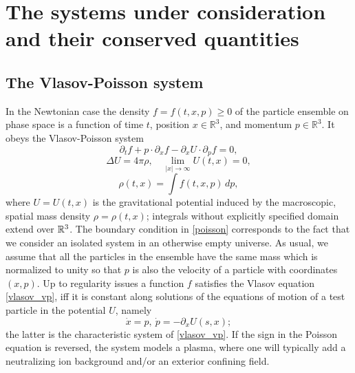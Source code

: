 \documentclass[11pt]{article}
\begin{document}
\section{The systems under consideration and their conserved quantities}
\setcounter{equation}{0}
%
%
\subsection{The Vlasov-Poisson system}\label{ss_vp}
%
%
In the Newtonian case the density $f=f(t,x,p)\geq 0$ of the particle
ensemble on phase space is a function of time $t$, position
$x\in {\mathbb R^3}$, and
momentum $p\in {\mathbb R^3}$. It obeys the Vlasov-Poisson system
\begin{equation} \label{vlasov_vp}
  \partial_t f+ p\cdot \partial_x f - \partial_x U\cdot\partial_p f = 0,
\end{equation}
\begin{equation} \label{poisson}
  \Delta U = 4\pi \rho,\quad \lim_{|x|\to\infty} U(t,x) = 0,
\end{equation}
\begin{equation} \label{rho_vp}
  \rho(t,x) = \int f(t,x,p)\,dp,
\end{equation}
where $U =U(t,x)$
is the gravitational potential induced by the macroscopic, spatial mass
density $\rho=\rho(t,x)$; integrals without explicitly specified domain
extend over $\mathbb R^3$. The boundary condition in \eqref{poisson} corresponds to
the fact that we consider an isolated system in an otherwise empty universe.
As usual, we assume that all the particles in the ensemble have the same
mass which is normalized to unity so that $p$ is also the velocity of
a particle with coordinates $(x,p)$. Up to regularity issues
a function $f$ satisfies the Vlasov equation \eqref{vlasov_vp}, iff
it is constant along solutions of the equations of motion of
a test particle in the potential $U$, namely
\begin{equation} \label{chars_vp}
  \dot x = p,\ \dot p = -\partial_x U(s,x);
\end{equation}
the latter is the characteristic system of \eqref{vlasov_vp}.
If the sign in the Poisson equation is reversed, the system models a plasma,
where one will typically add a neutralizing ion background and/or an exterior
confining field.
\end{document}
